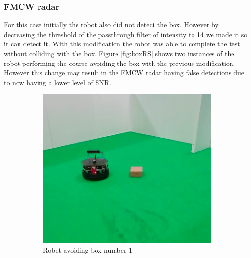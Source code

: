 \subsubsection*{FMCW radar}
For this case initially the robot also did not detect the box. However by decreasing the threshold of the passthrough filter of intensity to 14 we made it so it can detect it. With this modification the robot was able to complete the test without colliding with the box. Figure \ref{fig:boxRS} shows two instances of the robot performing the course avoiding the box with the previous modification. However this change may result in the \ac{FMCW} \ac{radar} having false detections due to now having a lower level of \ac{SNR}.

\begin{figure}[ht!]
  \centering
  \begin{subfigure}[b]{0.4\linewidth}
    \includegraphics[width=\linewidth]{imgs/chapter5/boxRS.png}
     \caption{Robot avoiding box number 1}
     \label{fig::wchair}
  \end{subfigure}
  \begin{subfigure}[b]{0.38\linewidth}

\end{subfigure}
\end{figure}
